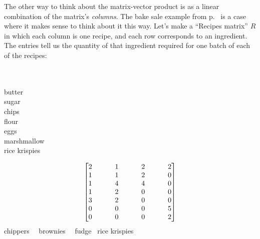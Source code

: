 \bigskip


\label{linearComboOfColumns}

The other way to think about the matrix-vector product is as a linear
combination of the matrix's \textit{columns}. The bake sale example from
p.~\pageref{bakeSale} is a case where it makes sense to think about it this
way. Let's make a ``Recipes matrix'' $R$ in which each column is one recipe,
and each row corresponds to an ingredient. The entries tell us the quantity of
that ingredient required for one batch of each of the recipes:

\vspace{-.3in} 
\begin{center}
\begin{multicols}{2}
\begin{flushright}
\hspace*{1cm} \\
\hspace*{1cm} \\
\small{butter} \\
\small{sugar} \\
\small{chips} \\
\small{flour} \\
\small{eggs} \\
\small{marshmallow} \\
\small{rice krispies} \\
\end{flushright}
\columnbreak
\vspace{-1.5in} 
\begin{align*}
\setlength\arraycolsep{13pt}
\begin{bmatrix}
2 \ & \ 1 \ & \ 2 \ & \ 2 \\
1 \ & \ 1 \ & \ 2 \ & \ 0 \\
1 \ & \ 4 \ & \ 4 \ & \ 0 \\
1 \ & \ 2 \ & \ 0 \ & \ 0 \\
3 \ & \ 2 \ & \ 0 \ & \ 0 \\
0 \ & \ 0 \ & \ 0 \ & \ 5 \\
0 \ & \ 0 \ & \ 0 \ & \ 2 \\
\end{bmatrix}
\end{align*}
\vspace{-.15in}
\hspace*{-.1in}
\scriptsize{chippers} \ \ \scriptsize{brownies} \ \  \scriptsize{fudge} \ 
\scriptsize{rice krispies} \\
\end{multicols}
\end{center}
\vspace{-.15in}

